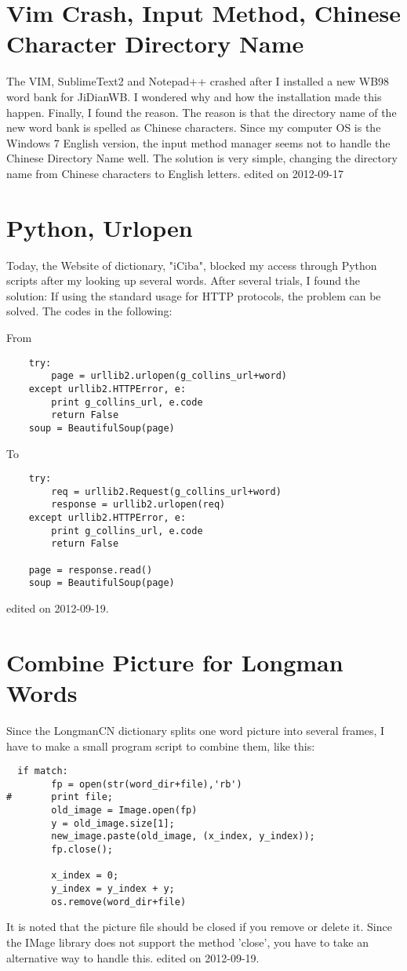 \section{Vim Crash, Input Method, Chinese Character Directory Name}
The VIM, SublimeText2 and Notepad++ crashed after I installed a new WB98 word bank for JiDianWB.
I wondered why and how the installation made this happen. 
Finally, I found the reason.
The reason is that the directory name of the new word bank is spelled as Chinese characters.
Since my computer OS is the Windows 7 English version, the input method manager seems not to handle the Chinese Directory Name well.
The solution is very simple, changing the directory name from Chinese characters to English letters.
\hfill {\tiny  edited on 2012-09-17}

\section{Python, Urlopen}
Today, the Website of dictionary, "iCiba", blocked my access through Python scripts after my looking up several words. 
After several trials, I found the solution: If using the standard usage for HTTP protocols, the problem can be solved.
The codes in the following:

\par From 
\begin{verbatim}
    try:
        page = urllib2.urlopen(g_collins_url+word)
    except urllib2.HTTPError, e:
        print g_collins_url, e.code
        return False
    soup = BeautifulSoup(page)

\end{verbatim}

\par To
\begin{verbatim}
    try:
        req = urllib2.Request(g_collins_url+word)
        response = urllib2.urlopen(req)
    except urllib2.HTTPError, e:
        print g_collins_url, e.code
        return False

    page = response.read()
    soup = BeautifulSoup(page)
\end{verbatim}
\hfill {\tiny  edited on 2012-09-19.}
%
\section{Combine Picture for Longman Words}
Since the LongmanCN dictionary splits one word picture into several frames,
I have to make a small program script to combine them, like this:
\begin{verbatim}
  if match:
        fp = open(str(word_dir+file),'rb')
#       print file;
        old_image = Image.open(fp)
        y = old_image.size[1];
        new_image.paste(old_image, (x_index, y_index));
        fp.close();

        x_index = 0;
        y_index = y_index + y;
        os.remove(word_dir+file)
\end{verbatim}
It is noted that the picture file should be closed if you remove or delete it. 
Since the IMage library does not support the method 'close',
you have to take an alternative way to handle this.
\hfill {\tiny  edited on 2012-09-19.}


